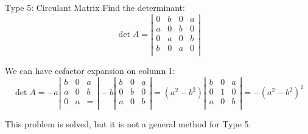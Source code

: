 \documentclass{beamer}
\begin{document}
\begin{frame}{Type 5: Circulant Matrix}
Find the determinant:
\begin{equation*}
\det A=\left| \begin{matrix}
	0&		b&		0&		a\\
	a&		0&		b&		0\\
	0&		a&		0&		b\\
	b&		0&		a&		0\\
\end{matrix} \right|
\end{equation*}

We can have cofactor expansion on column 1:
\begin{equation*}
    \det A=-a\left| \begin{matrix}
        b&		0&		a\\
        a&		0&		b\\
        0&		a&		=\\
    \end{matrix} \right|-b\left| \begin{matrix}
        b&		0&		a\\
        0&		b&		0\\
        a&		0&		b\\
    \end{matrix} \right|=\left( a^2-b^2 \right) \left| \begin{matrix}
        b&		0&		a\\
        0&		1&		0\\
        a&		0&		b\\
    \end{matrix} \right|=-\left( a^2-b^2 \right) ^2
\end{equation*}

This problem is solved, but it is not a general method for Type 5.

\end{frame}
\end{document}
